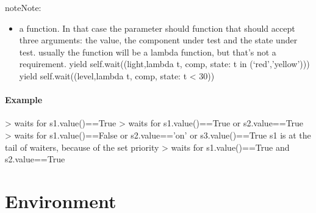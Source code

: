 \documentclass[letterpaper,10pt,english]{sphinxmanual}
\begin{document}
\begin{fulllineitems}
\begin{fulllineitems}
\begin{sphinxadmonition}{note}{Note:}
\begin{itemize}
\item {} 
a function. In that case the parameter should function that
should accept three arguments: the value, the component under test and the
state under test. 
usually the function will be a lambda function, but that’s not
a requirement. 
yield self.wait((light,lambda t, comp, state: t in (‘red’,’yellow’))) 
yield self.wait((level,lambda t, comp, state: t \textless{} 30)) 

\end{itemize}
\end{sphinxadmonition}
\paragraph{Example}

\textendash{}\textgreater{} waits for s1.value()==True 
\textendash{}\textgreater{} waits for s1.value()==True or s2.value==True 
\textendash{}\textgreater{} waits for s1.value()==False or s2.value==’on’ or s3.value()==True 
s1 is at the tail of waiters, because of the set priority 
\textendash{}\textgreater{} waits for s1.value()==True and s2.value==True 

\end{fulllineitems}


\end{fulllineitems}



\section{Environment}
\label{\detokenize{Reference:environment}}
\end{document}
